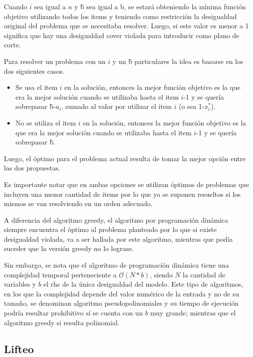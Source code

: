 Cuando $i$ sea igual a $n$ y \~b sea igual a b, se estar\'a obteniendo la m\'inima funci\'on objetivo utilizando todos los items y teniendo como restricci\'on la desigualdad original del problema que se necesitaba resolver. Luego, si este valor es menor a 1 significa que hay una desigualdad cover violada para introducir como plano de corte.



Para resolver un problema con un $i$ y un \~b particulares la idea es basarse en los dos siguientes casos.

\begin{itemize}
\item Se usa el item $i$ en la soluci\'on, entonces la mejor funci\'on objetivo es la que era la mejor soluci\'on cuando se utilizaba hasta el item $i$-1 y se quer\'ia sobrepasar \~b-$a_{i}$, sumado al valor por utilizar el item $i$ (o sea 1-$x_i^*$).
\item No se utiliza el item $i$ en la soluci\'on, entonces la mejor funci\'on objetivo es la que era la mejor soluci\'on cuando se utilizaba hasta el item $i$-1 y se quer\'ia sobrepasar \~b.
\end{itemize}

Luego, el \'optimo para el problema actual resulta de tomar la mejor opci\'on entre las dos propuestas.

Es importante notar que en ambas opciones se utilizan \'optimos de problemas que incluyen una menor cantidad de items por lo que ya se suponen resueltos si los mismos se van resolviendo en un orden adecuado.

A diferencia del algoritmo greedy, el algoritmo por programaci\'on din\'amica siempre encuentra el \'optimo al problema planteado por lo que si existe desigualdad violada, va a ser hallada por este algoritmo, mientras que pod\'ia suceder que la versi\'on greedy no lo lograse. 

Sin embargo, se nota que el algoritmo de programaci\'on din\'amica tiene una complejidad temporal perteneciente a $\mathcal{O}(N*b)$, siendo $N$ la cantidad de variables y $b$ el rhs de la \'unica desigualdad del modelo. Este tipo de algoritmos, en los que la complejidad depende del valor num\'erico de la entrada y no de su tama\~no, se denominan algoritmo pseudopolinomiales y su tiempo de ejecuci\'on podr\'ia resultar prohibitivo s\'i se cuenta con un $b$ muy grande; mientras que el algoritmo greedy si resulta polinomial.


\bigskip
\subsection{Lifteo}

